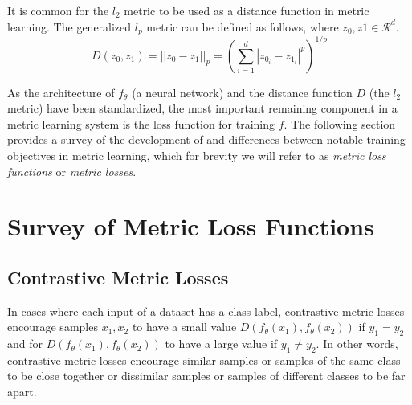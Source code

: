 \documentclass[./dissertation.tex]{subfiles}
\begin{document}
    It is common for the $l_{2}$ metric to be used as a distance function in metric learning. The generalized $l_p$ metric can be defined as follows, where $z_{0}, z{1} \in \mathcal{R}^{d}$.
          \begin{equation*}
            D(z_{0}, z_{1})= || z_{0} - z_{1} ||_{p} =
            (\sum_{i=1}^d | z_{0_{i}} - z_{1_{i}} |^{p})^{1/p} 
          \end{equation*}
    
    As the architecture of $f_{\theta}$ (a neural network) and the distance function $D$ (the $l_{2}$ metric) have been standardized, the most important remaining component in a metric learning system is the loss function for training $f$. The following section provides a survey of the development of and differences between notable training objectives in metric learning, which for brevity we will refer to as \textit{metric loss functions} or \textit{metric losses}.
    
    \section{Survey of Metric Loss Functions}
    
    \subsection{Contrastive Metric Losses}
    In cases where each input of a dataset has a class label, contrastive metric losses encourage samples $x_{1}, x_{2}$ to have a small value $D(f_{\theta}(x_{1}), f_{\theta}(x_{2}))$ if $y_1 = y_2$ and for  $D(f_{\theta}(x_{1}), f_{\theta}(x_{2}))$ to have a large value if $y_1 \neq y_2$. In other words, contrastive metric losses encourage similar samples or samples of the same class to be close together or dissimilar samples or samples of different classes to be far apart. \\
    
\end{document}
